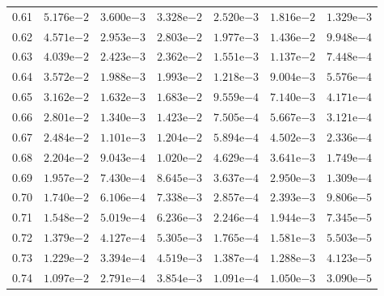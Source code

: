 \begin{table}[htb!]
\begin{tabular}{|c|cc|cc|cc|}
0.61 & $5.176\mathrm{e}{-2}$ & $3.600\mathrm{e}{-3}$ & $3.328\mathrm{e}{-2}$ & $2.520\mathrm{e}{-3}$ & $1.816\mathrm{e}{-2}$ & $1.329\mathrm{e}{-3}$ \\
0.62 & $4.571\mathrm{e}{-2}$ & $2.953\mathrm{e}{-3}$ & $2.803\mathrm{e}{-2}$ & $1.977\mathrm{e}{-3}$ & $1.436\mathrm{e}{-2}$ & $9.948\mathrm{e}{-4}$ \\
0.63 & $4.039\mathrm{e}{-2}$ & $2.423\mathrm{e}{-3}$ & $2.362\mathrm{e}{-2}$ & $1.551\mathrm{e}{-3}$ & $1.137\mathrm{e}{-2}$ & $7.448\mathrm{e}{-4}$ \\
0.64 & $3.572\mathrm{e}{-2}$ & $1.988\mathrm{e}{-3}$ & $1.993\mathrm{e}{-2}$ & $1.218\mathrm{e}{-3}$ & $9.004\mathrm{e}{-3}$ & $5.576\mathrm{e}{-4}$ \\
0.65 & $3.162\mathrm{e}{-2}$ & $1.632\mathrm{e}{-3}$ & $1.683\mathrm{e}{-2}$ & $9.559\mathrm{e}{-4}$ & $7.140\mathrm{e}{-3}$ & $4.171\mathrm{e}{-4}$ \\
0.66 & $2.801\mathrm{e}{-2}$ & $1.340\mathrm{e}{-3}$ & $1.423\mathrm{e}{-2}$ & $7.505\mathrm{e}{-4}$ & $5.667\mathrm{e}{-3}$ & $3.121\mathrm{e}{-4}$ \\
0.67 & $2.484\mathrm{e}{-2}$ & $1.101\mathrm{e}{-3}$ & $1.204\mathrm{e}{-2}$ & $5.894\mathrm{e}{-4}$ & $4.502\mathrm{e}{-3}$ & $2.336\mathrm{e}{-4}$ \\
0.68 & $2.204\mathrm{e}{-2}$ & $9.043\mathrm{e}{-4}$ & $1.020\mathrm{e}{-2}$ & $4.629\mathrm{e}{-4}$ & $3.641\mathrm{e}{-3}$ & $1.749\mathrm{e}{-4}$ \\
0.69 & $1.957\mathrm{e}{-2}$ & $7.430\mathrm{e}{-4}$ & $8.645\mathrm{e}{-3}$ & $3.637\mathrm{e}{-4}$ & $2.950\mathrm{e}{-3}$ & $1.309\mathrm{e}{-4}$ \\
0.70 & $1.740\mathrm{e}{-2}$ & $6.106\mathrm{e}{-4}$ & $7.338\mathrm{e}{-3}$ & $2.857\mathrm{e}{-4}$ & $2.393\mathrm{e}{-3}$ & $9.806\mathrm{e}{-5}$ \\
0.71 & $1.548\mathrm{e}{-2}$ & $5.019\mathrm{e}{-4}$ & $6.236\mathrm{e}{-3}$ & $2.246\mathrm{e}{-4}$ & $1.944\mathrm{e}{-3}$ & $7.345\mathrm{e}{-5}$ \\
0.72 & $1.379\mathrm{e}{-2}$ & $4.127\mathrm{e}{-4}$ & $5.305\mathrm{e}{-3}$ & $1.765\mathrm{e}{-4}$ & $1.581\mathrm{e}{-3}$ & $5.503\mathrm{e}{-5}$ \\
0.73 & $1.229\mathrm{e}{-2}$ & $3.394\mathrm{e}{-4}$ & $4.519\mathrm{e}{-3}$ & $1.387\mathrm{e}{-4}$ & $1.288\mathrm{e}{-3}$ & $4.123\mathrm{e}{-5}$ \\
0.74 & $1.097\mathrm{e}{-2}$ & $2.791\mathrm{e}{-4}$ & $3.854\mathrm{e}{-3}$ & $1.091\mathrm{e}{-4}$ & $1.050\mathrm{e}{-3}$ & $3.090\mathrm{e}{-5}$ \\

\end{tabular}
\end{table}
